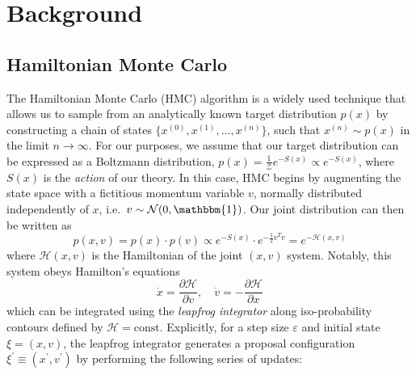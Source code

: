 \documentclass{article} %
\begin{document}
\section{\label{sec:background}Background}
\subsection{\label{sec:hamiltonian_dynamics}Hamiltonian Monte Carlo}
%
The Hamiltonian Monte Carlo (HMC) algorithm is a widely used technique that allows us to sample from an analytically
known target distribution \(p(x)\) by constructing a chain of states \(\{x^{(0)},
x^{(1)}, \ldots, x^{(n)}\}\), such that \(x^{(n)}\sim p(x)\) in the limit
\(n\rightarrow\infty\).
%
For our purposes, we assume that our target distribution can be expressed as a Boltzmann distribution, \(p(x) =
\tfrac{1}{\mathcal{Z}} e^{-S(x)}\propto e^{-S(x)}\), where \(S(x)\) is the \emph{action} of our
theory.
%
In this case, HMC begins by augmenting the state space with a fictitious momentum variable \(v\), normally
distributed independently of \(x\), i.e.\ \(v\sim\mathcal{N}(0, \mathbbm{1})\).
%
Our joint distribution can then be written as
%
\begin{equation}
   p(x, v) = p(x)\cdot p(v) \propto e^{-S(x)}\cdot e^{-\frac{1}{2}v^{T}v} = e^{-\mathcal{H}(x, v)}
\end{equation}
%
where \(\mathcal{H}(x, v)\) is the Hamiltonian of the joint \((x, v)\) system.
%
Notably, this system obeys Hamilton's equations
%
\begin{equation}
   \dot{x} = \frac{\partial\mathcal{H}}{\partial v},\quad \dot{v} = -\frac{\partial\mathcal{H}}{\partial x}
\end{equation}
%
which can be integrated using the \emph{leapfrog integrator} along iso-probability contours defined by \(\mathcal{H} =
\text{const}\).
%
Explicitly, for a step size \(\varepsilon\) and initial state \(\xi = (x, v)\), the leapfrog integrator generates a
proposal configuration \(\xi^{\prime} \equiv (x^{\prime}, v^{\prime})\) by performing the following series of updates: 
%
\end{document}
